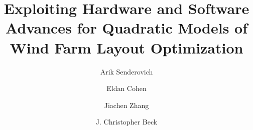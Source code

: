 \documentclass[preprint,12pt]{elsarticle}
\newcommand{\mytitle}{Exploiting Hardware and Software Advances 
 for Quadratic Models of Wind Farm Layout Optimization}
\begin{document}
	

\title{\mytitle}



\author[add1]{Arik Senderovich}


\author[add2]{Eldan Cohen}







\author[add2]{Jiachen Zhang}

\author[add2]{J. Christopher Beck}


\address[add1]{Faculty of Information, University of Toronto, 140 St. George St., Toronto, Canada}
\address[add2]{Department of Mechanical and Industrial Engineering, University of Toronto, 40 St. George St., Toronto, Canada}
\end{document}
